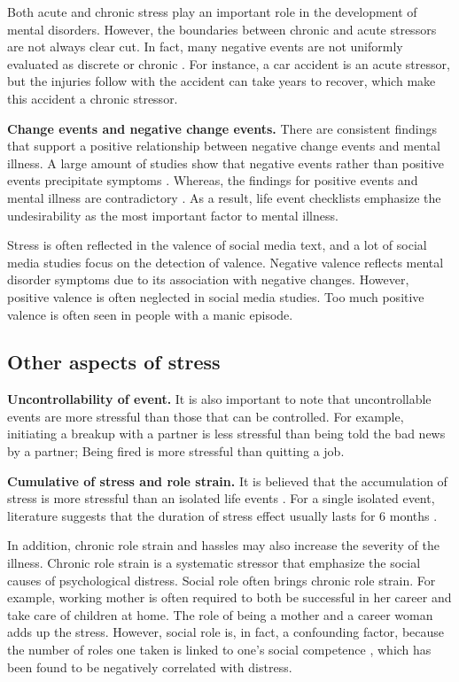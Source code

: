 Both acute and chronic stress play an important role in the development of mental disorders. However, the boundaries between chronic and acute stressors are not always clear cut. In fact, many negative events are not uniformly evaluated as discrete or chronic \cite{avison1988stressful}. For instance, a car accident is an acute stressor, but the injuries follow with the accident can take years to recover, which make this accident a chronic stressor.

\textbf{Change events and negative change events.} There are consistent findings that support a positive relationship between negative change events and mental illness. A large amount of studies show that negative events rather than positive events precipitate symptoms \cite{rabkin1976life,turner1995epidemiology}. Whereas, the findings for positive events and mental illness are contradictory \cite{zautra1983life}. As a result, life event checklists emphasize the undesirability as the most important factor to mental illness. 

Stress is often reflected in the valence of social media text, and a lot of social media studies focus on the detection of valence. Negative valence reflects mental disorder symptoms due to its association with negative changes. However, positive valence is often neglected in social media studies. Too much positive valence is often seen in people with a manic episode. 

\subsection{Other aspects of stress} 
\textbf{Uncontrollability of event.} It is also important to note that uncontrollable events are more stressful than those that can be controlled. For example, initiating a breakup with a partner is less stressful than being told the bad news by a partner; Being fired is more stressful than quitting a job. 

\textbf{Cumulative of stress and role strain.} It is believed that the accumulation of stress is more stressful than an isolated life events \cite{evans2013childhood}. For a single isolated event, literature suggests that the duration of stress effect usually lasts for 6 months  \cite{depue1986conceptualization,norris1987transitory}. 

In addition, chronic role strain and hassles may also increase the severity of the illness. Chronic role strain is a systematic stressor that emphasize the social causes of psychological distress. Social role often brings chronic role strain. For example, working mother is often required to both be successful in her career and take care of children at home. The role of being a mother and a career woman adds up the stress. However, social role is, in fact, a confounding factor, because the number of roles one taken is linked to one's social competence \cite{cohen1997measuring}, which has been found to be negatively correlated with distress.

